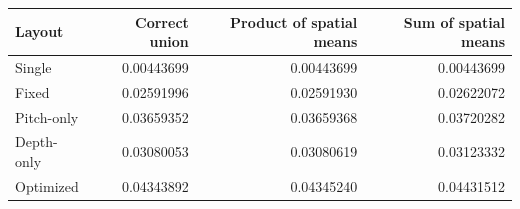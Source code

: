 \begin{tabular}{lrrr}
\toprule
Layout & Correct union & Product of spatial means & Sum of spatial means \\
\midrule
Single & 0.00443699 & 0.00443699 & 0.00443699 \\
Fixed & 0.02591996 & 0.02591930 & 0.02622072 \\
Pitch-only & 0.03659352 & 0.03659368 & 0.03720282 \\
Depth-only & 0.03080053 & 0.03080619 & 0.03123332 \\
Optimized & 0.04343892 & 0.04345240 & 0.04431512 \\
\bottomrule
\end{tabular}
